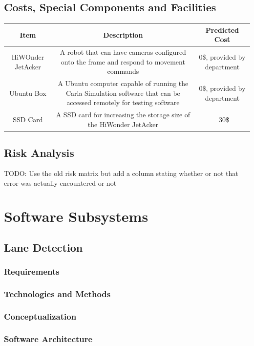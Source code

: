 \documentclass[titlepage]{article}
\begin{document}
\subsection{Costs, Special Components and Facilities}
\begin{center}
	\begin{tabular}{|c | c | c |} 
	 \hline
	 Item & Description & Predicted Cost \\ [0.5ex] 
	 \hline
	 HiWOnder JetAcker & A robot that can have cameras configured onto the frame and respond to movement commands & 0\$, provided by department \\
	 \hline
	 Ubuntu Box & A Ubuntu computer capable of running the Carla Simulation software that can be accessed remotely for testing software & 0\$, provided by department \\
	 \hline
	 SSD Card & A SSD card for increasing the storage size of the HiWonder JetAcker & ~30\$ \\
	 \hline
	\end{tabular}
	\end{center}

\subsection{Risk Analysis}
TODO: Use the old risk matrix but add a column stating whether or not that error was actually encountered or not

\section{Software Subsystems}

\subsection{Lane Detection}
\subsubsection{Requirements}
\subsubsection{Technologies and Methods}
\subsubsection{Conceptualization}
\subsubsection{Software Architecture}
\end{document}
